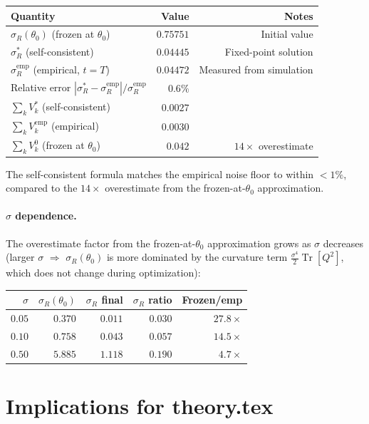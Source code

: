 \documentclass[american]{article}
\begin{document}
\begin{center}
\begin{tabular}{lrr}
\hline
Quantity & Value & Notes \\
\hline
$\sigma_R(\theta_0)$ (frozen at $\theta_0$) & $0.75751$ & Initial value \\
$\sigma_R^*$ (self-consistent) & $0.04445$ & Fixed-point solution \\
$\sigma_R^{\mathrm{emp}}$ (empirical, $t=T$) & $0.04472$ & Measured from simulation \\
Relative error $|\sigma_R^* - \sigma_R^{\mathrm{emp}}|/\sigma_R^{\mathrm{emp}}$ & $0.6\%$ & \\
\hline
$\sum_k V_k^*$ (self-consistent) & $0.0027$ & \\
$\sum_k V_k^{\mathrm{emp}}$ (empirical) & $0.0030$ & \\
$\sum_k V_k^0$ (frozen at $\theta_0$) & $0.042$ & $14\times$ overestimate \\
\hline
\end{tabular}
\end{center}

The self-consistent formula matches the empirical noise floor to within $<1\%$,
compared to the $14\times$ overestimate from the frozen-at-$\theta_0$ approximation.

\paragraph{$\sigma$ dependence.}
The overestimate factor from the frozen-at-$\theta_0$ approximation grows as $\sigma$ decreases
(larger $\sigma$ $\Rightarrow$ $\sigma_R(\theta_0)$ is more dominated by the curvature term
$\tfrac{\sigma^4}{2}\operatorname{Tr}[Q^2]$, which does not change during optimization):

\begin{center}
\begin{tabular}{rrrrr}
\hline
$\sigma$ & $\sigma_R(\theta_0)$ & $\sigma_R$ final & $\sigma_R$ ratio & Frozen/emp \\
\hline
$0.05$ & $0.370$ & $0.011$ & $0.030$ & $27.8\times$ \\
$0.10$ & $0.758$ & $0.043$ & $0.057$ & $14.5\times$ \\
$0.50$ & $5.885$ & $1.118$ & $0.190$ & $4.7\times$ \\
\hline
\end{tabular}
\end{center}

\section*{Implications for theory.tex}
\end{document}

